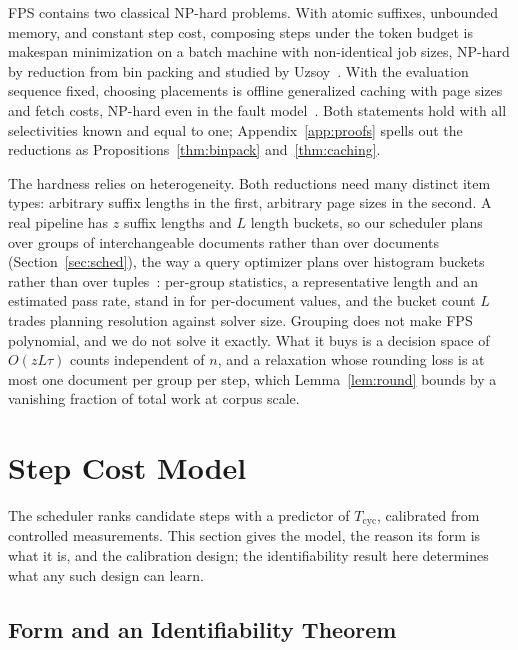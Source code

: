 \documentclass[10pt,twocolumn]{article}
\newcommand{\Tcyc}{T_{\mathrm{cyc}}}
\begin{document}
FPS contains two classical NP-hard problems. With atomic suffixes, unbounded memory, and constant step cost, composing steps under the token budget is makespan minimization on a batch machine with non-identical job sizes, NP-hard by reduction from bin packing and studied by Uzsoy~\cite{uzsoy}. With the evaluation sequence fixed, choosing placements is offline generalized caching with page sizes and fetch costs, NP-hard even in the fault model~\cite{cachinghard}. Both statements hold with all selectivities known and equal to one; Appendix~\ref{app:proofs} spells out the reductions as Propositions~\ref{thm:binpack} and~\ref{thm:caching}.

The hardness relies on heterogeneity. Both reductions need many distinct item types: arbitrary suffix lengths in the first, arbitrary page sizes in the second. A real pipeline has $z$ suffix lengths and $L$ length buckets, so our scheduler plans over groups of interchangeable documents rather than over documents (Section~\ref{sec:sched}), the way a query optimizer plans over histogram buckets rather than over tuples~\cite{histograms}: per-group statistics, a representative length and an estimated pass rate, stand in for per-document values, and the bucket count $L$ trades planning resolution against solver size. Grouping does not make FPS polynomial, and we do not solve it exactly. What it buys is a decision space of $O(zL\tau)$ counts independent of $n$, and a relaxation whose rounding loss is at most one document per group per step, which Lemma~\ref{lem:round} bounds by a vanishing fraction of total work at corpus scale.

\section{Step Cost Model}
\label{sec:cost}

The scheduler ranks candidate steps with a predictor of $\Tcyc$, calibrated from controlled measurements. This section gives the model, the reason its form is what it is, and the calibration design; the identifiability result here determines what any such design can learn.

\subsection{Form and an Identifiability Theorem}
\end{document}
